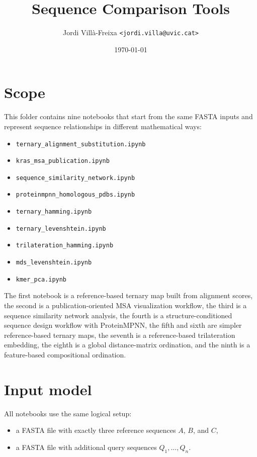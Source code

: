 \documentclass[11pt,a4paper]{article}
\title{Sequence Comparison Tools}
\author{Jordi Vill\`a-Freixa \texttt{<jordi.villa@uvic.cat>}}
\date{\today}
\begin{document}
\maketitle

\tableofcontents

\section{Scope}

This folder contains nine notebooks that start from the same FASTA inputs and represent sequence relationships in different mathematical ways:

\begin{itemize}[leftmargin=*]
\item \texttt{ternary\_alignment\_substitution.ipynb}
\item \texttt{kras\_msa\_publication.ipynb}
\item \texttt{sequence\_similarity\_network.ipynb}
\item \texttt{proteinmpnn\_homologous\_pdbs.ipynb}
\item \texttt{ternary\_hamming.ipynb}
\item \texttt{ternary\_levenshtein.ipynb}
\item \texttt{trilateration\_hamming.ipynb}
\item \texttt{mds\_levenshtein.ipynb}
\item \texttt{kmer\_pca.ipynb}
\end{itemize}

The first notebook is a reference-based ternary map built from alignment scores, the second is a publication-oriented MSA visualization workflow, the third is a sequence similarity network analysis, the fourth is a structure-conditioned sequence design workflow with ProteinMPNN, the fifth and sixth are simpler reference-based ternary maps, the seventh is a reference-based trilateration embedding, the eighth is a global distance-matrix ordination, and the ninth is a feature-based compositional ordination.

\section{Input model}

All notebooks use the same logical setup:

\begin{itemize}[leftmargin=*]
\item a FASTA file with exactly three reference sequences $A$, $B$, and $C$,
\item a FASTA file with additional query sequences $Q_1,\dots,Q_n$.
\end{itemize}
\end{document}
